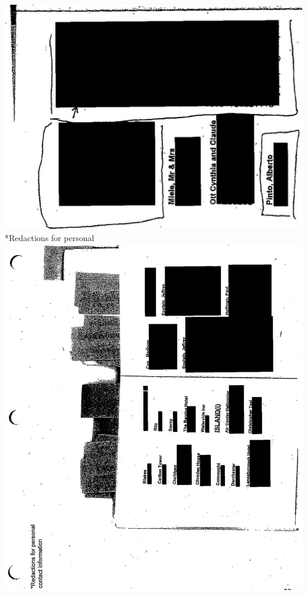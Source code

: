 \documentclass[10pt]{article}
\begin{document}
\includegraphics[max width=\textwidth, center]{2025_02_27_dd68c3d38de88f0516d9g-188(1)}\\
*Redactions for personal\\
\includegraphics[max width=\textwidth, center]{2025_02_27_dd68c3d38de88f0516d9g-189}\\
\end{document}
